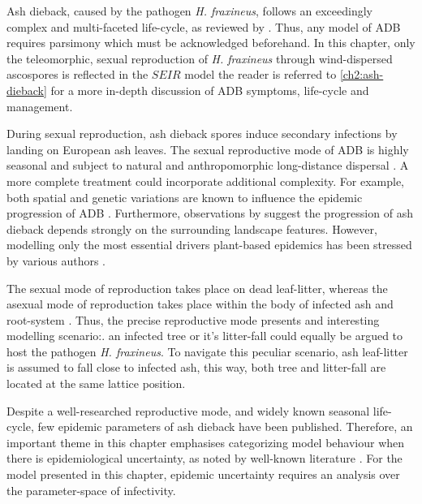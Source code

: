 Ash dieback, caused by the pathogen \textit{H. fraxineus}, follows an exceedingly complex and multi-faceted life-cycle, as reviewed by \cite{gross2014h}.
Thus, any model of ADB requires parsimony which must be acknowledged beforehand. 
In this chapter, only the teleomorphic, sexual reproduction of \textit{H. fraxineus} through wind-dispersed ascospores is reflected in the $SEIR$ model\textemdash
the reader is referred to \ref{ch2:ash-dieback} for a more in-depth discussion of ADB symptoms, life-cycle and management.

During sexual reproduction, ash dieback spores induce secondary infections by landing on European ash leaves.
The sexual reproductive mode of ADB is highly seasonal and subject to natural and anthropomorphic long-distance dispersal \cite{grosdidier2018tracking}. 
A more complete treatment could incorporate additional complexity.
For example, both spatial and genetic variations are known to influence the epidemic progression of ADB \cite{stocks2017first, mckinney2014ash}. 
Furthermore, observations by \cite{doi:10.1111/1365-2745.13383} suggest the progression of ash dieback depends strongly on the surrounding landscape features.
However, modelling only the most essential drivers plant-based epidemics has been stressed by various authors \cite{13-challenges, time-varying-infectivity}.

The sexual mode of reproduction takes place on dead leaf-litter, whereas the asexual mode of reproduction takes place within the body of infected ash and root-system \cite{gross2012reproductive}.
Thus, the precise reproductive mode presents and interesting modelling scenario:. an infected tree or it's litter-fall could equally be argued to host the pathogen \textit{H. fraxineus}.
To navigate this peculiar scenario, ash leaf-litter is assumed to fall close to infected ash, this way, both tree and litter-fall are located at the same lattice position.

Despite a well-researched reproductive mode, and widely known seasonal life-cycle, few epidemic parameters of ash dieback have been published.
Therefore, an important theme in this chapter emphasises categorizing model behaviour when there is epidemiological uncertainty, 
as noted by well-known literature \cite{13-challenges, WEBIDEMICS}.
For the model presented in this chapter, epidemic uncertainty requires an analysis over the parameter-space of infectivity.


